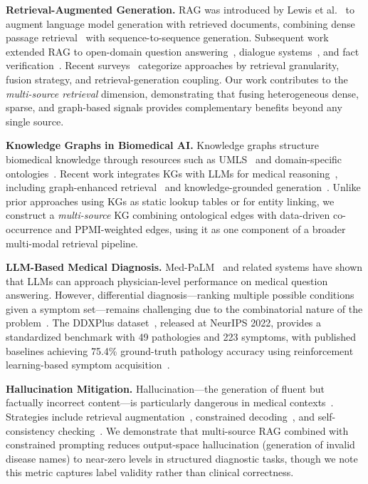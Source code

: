\documentclass[runningheads]{llncs}
\begin{document}
\textbf{Retrieval-Augmented Generation.} RAG was introduced by Lewis et al.~\cite{lewis2020retrieval} to augment language model generation with retrieved documents, combining dense passage retrieval~\cite{karpukhin2020dense} with sequence-to-sequence generation. Subsequent work extended RAG to open-domain question answering~\cite{izacard2021leveraging}, dialogue systems~\cite{shuster2021retrieval}, and fact verification~\cite{thorne2018fever}. Recent surveys~\cite{gao2023retrieval,zhao2024retrieval} categorize approaches by retrieval granularity, fusion strategy, and retrieval-generation coupling. Our work contributes to the \emph{multi-source retrieval} dimension, demonstrating that fusing heterogeneous dense, sparse, and graph-based signals provides complementary benefits beyond any single source.

\textbf{Knowledge Graphs in Biomedical AI.} Knowledge graphs structure biomedical knowledge through resources such as UMLS~\cite{bodenreider2004unified} and domain-specific ontologies~\cite{santos2022knowledge,chandak2023building}. Recent work integrates KGs with LLMs for medical reasoning~\cite{pan2024unifying}, including graph-enhanced retrieval~\cite{he2024gretriever} and knowledge-grounded generation~\cite{yasunaga2022deep}. Unlike prior approaches using KGs as static lookup tables or for entity linking, we construct a \emph{multi-source} KG combining ontological edges with data-driven co-occurrence and PPMI-weighted edges, using it as one component of a broader multi-modal retrieval pipeline.

\textbf{LLM-Based Medical Diagnosis.} Med-PaLM~\cite{singhal2023large} and related systems have shown that LLMs can approach physician-level performance on medical question answering. However, differential diagnosis---ranking multiple possible conditions given a symptom set---remains challenging due to the combinatorial nature of the problem~\cite{mcduff2023towards}. The DDXPlus dataset~\cite{fansi2022ddxplus}, released at NeurIPS 2022, provides a standardized benchmark with 49 pathologies and 223 symptoms, with published baselines achieving 75.4\% ground-truth pathology accuracy using reinforcement learning-based symptom acquisition~\cite{fansi2022ddxplus}.

\textbf{Hallucination Mitigation.} Hallucination---the generation of fluent but factually incorrect content---is particularly dangerous in medical contexts~\cite{ji2023survey,umapathi2023med}. Strategies include retrieval augmentation~\cite{shuster2021retrieval}, constrained decoding~\cite{lu2022neurologic}, and self-consistency checking~\cite{manakul2023selfcheckgpt}. We demonstrate that multi-source RAG combined with constrained prompting reduces output-space hallucination (generation of invalid disease names) to near-zero levels in structured diagnostic tasks, though we note this metric captures label validity rather than clinical correctness.
\end{document}
